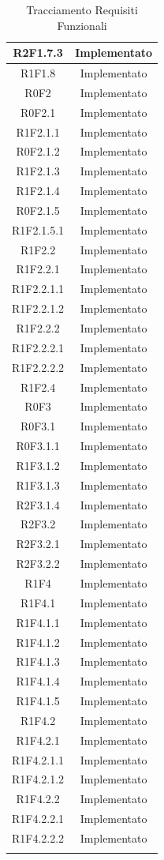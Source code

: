 \begin{longtable}{|c|c|}
	\hline
	R2F1.7.3 & Implementato\\
	\hline
	R1F1.8 & Implementato\\
	\hline
	R0F2 & Implementato\\
	\hline
	R0F2.1 & Implementato\\
	\hline
	R1F2.1.1 & Implementato\\
	\hline
	R0F2.1.2 & Implementato\\
	\hline
	R1F2.1.3 & Implementato\\
	\hline
	R1F2.1.4 & Implementato\\
	\hline
	R0F2.1.5 & Implementato\\
	\hline
	R1F2.1.5.1 & Implementato\\
	\hline
	R1F2.2 & Implementato\\
	\hline
	R1F2.2.1 & Implementato\\
	\hline
	R1F2.2.1.1 & Implementato\\
	\hline
	R1F2.2.1.2 & Implementato\\
	\hline
	R1F2.2.2 & Implementato\\
	\hline
	R1F2.2.2.1 & Implementato\\
	\hline
	R1F2.2.2.2 & Implementato\\
	\hline
	R1F2.4 & Implementato\\
	\hline
	R0F3 & Implementato\\
	\hline
	R0F3.1 & Implementato\\
	\hline
	R0F3.1.1 & Implementato\\
	\hline
	R1F3.1.2 & Implementato\\
	\hline
	R1F3.1.3 & Implementato\\
	\hline
	R2F3.1.4 & Implementato\\
	\hline
	R2F3.2 & Implementato\\
	\hline
	R2F3.2.1 & Implementato\\
	\hline
	R2F3.2.2 & Implementato\\
	\hline
	R1F4 & Implementato\\
	\hline
	R1F4.1 & Implementato\\
	\hline
	R1F4.1.1 & Implementato\\
	\hline
	R1F4.1.2 & Implementato\\
	\hline
	R1F4.1.3 & Implementato\\
	\hline
	R1F4.1.4 & Implementato\\
	\hline
	R1F4.1.5 & Implementato\\
	\hline
	R1F4.2 & Implementato\\
	\hline
	R1F4.2.1 & Implementato\\
	\hline
	R1F4.2.1.1 & Implementato\\
	\hline
	R1F4.2.1.2 & Implementato\\
	\hline
	R1F4.2.2 & Implementato\\
	\hline
	R1F4.2.2.1 & Implementato\\
	\hline
	R1F4.2.2.2 & Implementato\\
	\hline
	\caption[Tracciamento Requisiti Funzionali]{Tracciamento Requisiti Funzionali}
\end{longtable}

